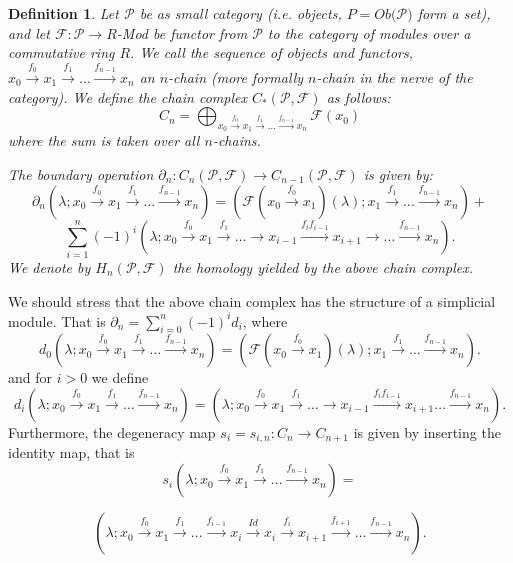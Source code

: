 \documentclass[11pt]{amsart}
\newtheorem{definition}[theorem]{Definition}
\theoremstyle{definition}
\begin{document}
\begin{definition}\label{NerveHomology}
Let ${\mathcal P}$ be as small category (i.e. objects, $P=Ob({\mathcal P)}$ form a set), and let ${\mathcal F}:{\mathcal P} \to R$-Mod
be functor from ${\mathcal P}$ to the category of modules over a commutative ring $R$.
We call the sequence of objects and functors, $x_0 \stackrel{f_0}{\to} x_1 \stackrel{f_1}{\to} \ldots
\stackrel{f_{n-1}}{\to} x_n$ an $n$-chain  (more formally $n$-chain in the nerve of the category).
We define the chain complex $C_*({\mathcal P},{\mathcal F})$ as follows:
$$ C_n= \bigoplus_{x_0 \stackrel{f_0}{\to} x_1 \stackrel{f_1}{\to} \ldots \stackrel{f_{n-1}}{\to} x_n} {\mathcal F}(x_0)$$
where the sum is taken over all $n$-chains.

The boundary operation $\partial_n: C_n({\mathcal P},{\mathcal F}) \to C_{n-1}({\mathcal P},{\mathcal F})$ is given by:
$$\partial_n(\lambda;x_0\stackrel{f_0}{\to} x_1 \stackrel{f_1}{\to} \ldots \stackrel{f_{n-1}}{\to} x_n)=
({\mathcal F}(x_0\stackrel{f_0}{\to} x_1)(\lambda);  x_1 \stackrel{f_1}{\to} \ldots \stackrel{f_{n-1}}{\to} x_n)+$$
$$\sum_{i=1}^n (-1)^i(\lambda;x_0\stackrel{f_0}{\to} x_1 \stackrel{f_1}{\to}\ldots \to
x_{i-1}\stackrel{f_if_{i-1}}{\to} x_{i+1}\to \ldots \stackrel{f_{n-1}}{\to} x_n).$$
We denote by $H_n({\mathcal P},{\mathcal F})$ the homology yielded by the above chain complex.
\end{definition}

We should stress that the above chain complex has the structure of a simplicial module. That is $\partial_n=\sum_{i=0}^n(-1)^id_i$, 
where $$d_0(\lambda;x_0\stackrel{f_0}{\to} x_1 \stackrel{f_1}{\to} \ldots \stackrel{f_{n-1}}{\to} x_n)=
({\mathcal F}(x_0\stackrel{f_0}{\to} x_1)(\lambda);  x_1 \stackrel{f_1}{\to} \ldots \stackrel{f_{n-1}}{\to} x_n).$$
and for $i>0$ we define
$$d_i(\lambda;x_0\stackrel{f_0}{\to} x_1 \stackrel{f_1}{\to} \ldots \stackrel{f_{n-1}}{\to} x_n)=(\lambda;x_0\stackrel{f_0}{\to} x_1 \stackrel{f_1}{\to}\ldots \to
x_{i-1}\stackrel{f_if_{i-1}}{\to} x_{i+1} \ldots \stackrel{f_{n-1}}{\to} x_n).$$ 
Furthermore, the degeneracy map $s_i=s_{i,n}: C_n \to C_{n+1}$ is given by inserting the identity map, that is $$s_i(\lambda;x_0\stackrel{f_0}{\to} x_1 \stackrel{f_1}{\to} \ldots \stackrel{f_{n-1}}{\to} x_n)=$$

$$(\lambda;x_0\stackrel{f_0}{\to} x_1 \stackrel{f_1}{\to} \ldots \stackrel{f_{i-1}}{\to} x_i \stackrel{Id}{\to} x_i \stackrel{f_i}{\to} x_{i+1} \stackrel{f_{i+1}}{\to}  \ldots \stackrel{f_{n-1}}{\to} x_n).$$
\end{document}
